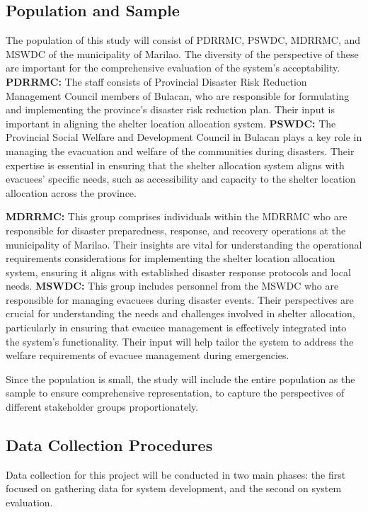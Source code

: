 \subsection{Population and Sample}
The population of this study will consist of PDRRMC, PSWDC, MDRRMC, and MSWDC of the municipality of Marilao. The diversity of the perspective of these are important for the comprehensive evaluation of the system’s acceptability.
\textbf{PDRRMC:} The staff consists of Provincial Disaster Risk Reduction Management Council members of Bulacan, who are responsible for formulating and implementing the province's disaster risk reduction plan. Their input is important in aligning the shelter location allocation system.
\textbf{PSWDC:} The Provincial Social Welfare and Development Council in Bulacan plays a key role in managing the evacuation and welfare of the communities during disasters. Their expertise is essential in ensuring that the shelter allocation system aligns with evacuees' specific needs, such as accessibility and capacity to the shelter location allocation across the province.

\textbf{MDRRMC:} This group comprises individuals within the MDRRMC who are responsible for disaster preparedness, response, and recovery operations at the municipality of Marilao. Their insights are vital for understanding the operational requirements considerations for implementing the shelter location allocation system, ensuring it aligns with established disaster response protocols and local needs.
\textbf{MSWDC:}  This group includes personnel from the MSWDC who are responsible for managing evacuees during disaster events. Their perspectives are crucial for understanding the needs and challenges involved in shelter allocation, particularly in ensuring that evacuee management is effectively integrated into the system’s functionality. Their input will help tailor the system to address the welfare requirements of evacuee management during emergencies.

Since the population is small, the study will include the entire population as the sample to ensure comprehensive representation, to capture the perspectives of different stakeholder groups proportionately.

\subsection{Data Collection Procedures}
Data collection for this project will be conducted in two main phases: the first focused on gathering data for system development, and the second on system evaluation.


